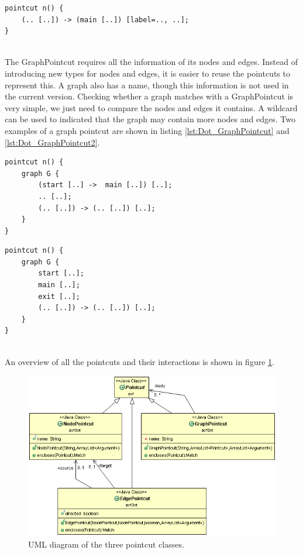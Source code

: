 \documentclass[a4paper]{report}
\begin{document}
\begin{minipage}{0.45\textwidth}
\begin{lstlisting}[caption=An edge pointcut matching any edge to main with a specified label., label=lst:Dot_EdgePointcut2]
pointcut n() {
	(.. [..]) -> (main [..]) [label=.., ..];
}
\end{lstlisting}
\end{minipage}
\\
The GraphPointcut requires all the information of its nodes and edges. Instead of introducing new types for nodes and edges, it is easier to reuse the pointcuts to represent this. A graph also has a name, though this information is not used in the current version. Checking whether a graph matches with a GraphPointcut is very simple, we just need to compare the nodes and edges it contains. A wildcard can be used to indicated that the graph may contain more nodes and edges. Two examples of a graph pointcut are shown in listing \ref{lst:Dot_GraphPointcut} and \ref{lst:Dot_GraphPointcut2}.\\
\begin{minipage}{0.45\textwidth}
\begin{lstlisting}[caption=A graph pointcut matching any graph G with an edge from start to main., label=lst:Dot_GraphPointcut]
pointcut n() {
	graph G {
		(start [..] ->  main [..]) [..];
		.. [..];
		(.. [..]) -> (.. [..]) [..];
	}
}
\end{lstlisting}
\end{minipage}\hfill
\begin{minipage}{0.45\textwidth}
\begin{lstlisting}[caption=A graph pointcut matching any graph G with only three nodes., label=lst:Dot_GraphPointcut2]
pointcut n() {
	graph G {
		start [..];
		main [..];
		exit [..];
		(.. [..]) -> (.. [..]) [..];
	}
}
\end{lstlisting}
\end{minipage}
\\
An overview of all the pointcuts and their interactions is shown in figure \ref{fig:DotPointcuts}.
\begin{figure}[h!]
\centering
\includegraphics[scale=0.6]{images/AOFDot/DotPointcuts.png}
\caption{UML diagram of the three pointcut classes.}
\label{fig:DotPointcuts}
\end{figure}
\end{document}
